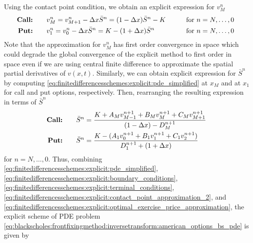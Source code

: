 Using the contact point condition, we obtain an explicit expression for $v^{n}_{M}$
\begin{subequations}
  \label{eq:finitedifferencesschemes:explicit:contact_point_approximation_2}
  \begin{align}
    \text{\textbf{Call:}} \qquad& v^{n}_{M} = v^{n}_{M+1} - \Delta{x}\bar{S}^{n} = (1-\Delta{x})\bar{S}^n - K & \qquad \text{for $n = N,\dots,0$ }\\
    \text{\textbf{Put:}} \qquad& v^{n}_{1} = v^{n}_{0} - \Delta{x}\bar{S}^{n} = K - (1+\Delta{x})\bar{S}^n & \qquad \text{for $n = N,\dots,0$ }
  \end{align}    
\end{subequations}
Note that the approximation for $v^{n}_{M}$ has first order convergence in space which could degrade the global convergence of the explicit method to first order in space even if we are using central finite difference to approximate the spatial partial derivatives of $v(x,t)$. Similarly, we can obtain explicit expression for $\bar{S}^{n}$ by computing \eqref{eq:finitedifferencesschemes:explicit:pde_simplified} at $x_M$ and at $x_1$ for call and put options, respectively. Then, rearranging the resulting expression in terms of $\bar{S}^n$ 
\begin{subequations}
  \label{eq:finitedifferencesschemes:explicit:optimal_exercise_price_approximation}
  \begin{align}
    \text{\textbf{Call:}} \qquad& \bar{S}^{n} = \dfrac{K + A_{M}v^{n+1}_{M-1} + B_{M}v^{n+1}_{M} + C_{M}v^{n+1}_{M+1}}{(1-\Delta{x}) - D^{n+1}_{M}} \\
    \text{\textbf{Put:}} \qquad& \bar{S}^{n} = \dfrac{K - (A_{1}v^{n+1}_{0} + B_{1}v^{n+1}_{1} + C_{1}v^{n+1}_{2})}{D^{n+1}_1 + (1+\Delta{x})}
  \end{align}
\end{subequations}
for $n = N,\dots,0$. Thus, combining \eqref{eq:finitedifferencesschemes:explicit:pde_simplified}, \eqref{eq:finitedifferencesschemes:explicit:boundary_conditions}, 
\eqref{eq:finitedifferencesschemes:explicit:terminal_conditions},
\eqref{eq:finitedifferencesschemes:explicit:contact_point_approximation_2}, and \eqref{eq:finitedifferencesschemes:explicit:optimal_exercise_price_approximation}, the explicit scheme of PDE problem \eqref{eq:blackscholes:frontfixingmethod:inversetransform:american_options_bs_pde} is given by
